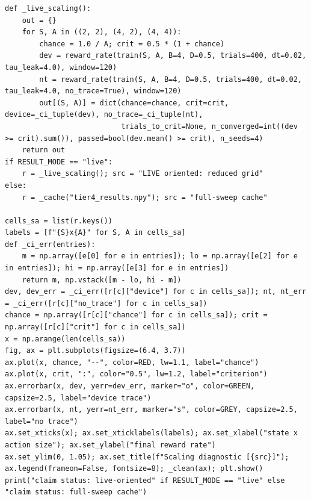 \begin{lstlisting}[caption={02\_closed\_loop\_rl.ipynb code cell 3},label={lst:mrl-nb-02-closed-loop-rl-3}]
def _live_scaling():
    out = {}
    for S, A in ((2, 2), (4, 2), (4, 4)):
        chance = 1.0 / A; crit = 0.5 * (1 + chance)
        dev = reward_rate(train(S, A, B=4, D=0.5, trials=400, dt=0.02, tau_leak=4.0), window=120)
        nt = reward_rate(train(S, A, B=4, D=0.5, trials=400, dt=0.02, tau_leak=4.0, no_trace=True), window=120)
        out[(S, A)] = dict(chance=chance, crit=crit, device=_ci_tuple(dev), no_trace=_ci_tuple(nt),
                           trials_to_crit=None, n_converged=int((dev >= crit).sum()), passed=bool(dev.mean() >= crit), n_seeds=4)
    return out
if RESULT_MODE == "live":
    r = _live_scaling(); src = "LIVE oriented: reduced grid"
else:
    r = _cache("tier4_results.npy"); src = "full-sweep cache"

cells_sa = list(r.keys())
labels = [f"{S}x{A}" for S, A in cells_sa]
def _ci_err(entries):
    m = np.array([e[0] for e in entries]); lo = np.array([e[2] for e in entries]); hi = np.array([e[3] for e in entries])
    return m, np.vstack([m - lo, hi - m])
dev, dev_err = _ci_err([r[c]["device"] for c in cells_sa]); nt, nt_err = _ci_err([r[c]["no_trace"] for c in cells_sa])
chance = np.array([r[c]["chance"] for c in cells_sa]); crit = np.array([r[c]["crit"] for c in cells_sa])
x = np.arange(len(cells_sa))
fig, ax = plt.subplots(figsize=(6.4, 3.7))
ax.plot(x, chance, "--", color=RED, lw=1.1, label="chance")
ax.plot(x, crit, ":", color="0.5", lw=1.2, label="criterion")
ax.errorbar(x, dev, yerr=dev_err, marker="o", color=GREEN, capsize=2.5, label="device trace")
ax.errorbar(x, nt, yerr=nt_err, marker="s", color=GREY, capsize=2.5, label="no trace")
ax.set_xticks(x); ax.set_xticklabels(labels); ax.set_xlabel("state x action size"); ax.set_ylabel("final reward rate")
ax.set_ylim(0, 1.05); ax.set_title(f"Scaling diagnostic [{src}]"); ax.legend(frameon=False, fontsize=8); _clean(ax); plt.show()
print("claim status: live-oriented" if RESULT_MODE == "live" else "claim status: full-sweep cache")
\end{lstlisting}

